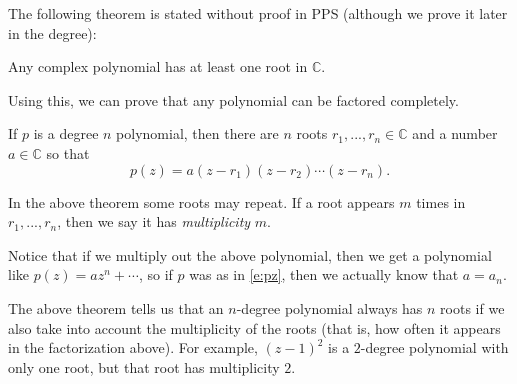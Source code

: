 \documentclass[11pt,dvipsnames]{book}
\numberwithin{figure}{section} %
\numberwithin{table}{section} %
\begin{document}
The following theorem is stated without proof in PPS (although we prove it later in the degree):

\begin{theorem}
Any complex polynomial has at least one root in $\mathbb{C}$.
\end{theorem}

Using this, we can prove that any polynomial can be factored completely.

\begin{theorem}
If $p$ is a degree $n$ polynomial, then there are $n$ roots $r_{1},...,r_{n}\in\mathbb{C}$ and a number $a\in\mathbb{C}$ so that
\[
p(z) = a(z-r_{1})(z-r_{2})\cdots (z-r_{n}).\]
\end{theorem}
In the above theorem some roots may repeat. If a root appears $m$ times in $r_{1},...,r_{n}$, then we say it has {\it multiplicity} $m$.

Notice that if we multiply out the above polynomial, then we get a polynomial like $p(z)=az^{n}+\cdots $, so if $p$ was as in \eqref{e:pz}, then we actually know that $a=a_n$.

The above theorem tells us that an $n$-degree polynomial always has $n$ roots if we also take into account the multiplicity of the roots (that is, how often it appears in the factorization above). For example, $(z-1)^2$ is a $2$-degree polynomial with only one root, but that root has multiplicity $2$.
\end{document}
